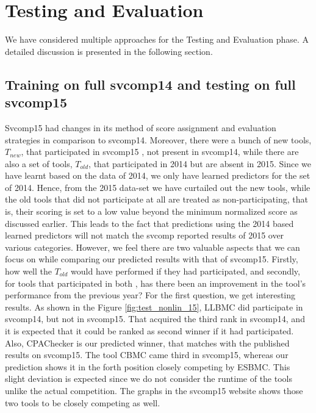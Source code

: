 \section{Testing and Evaluation}
\label{eval}
We have considered multiple approaches for the Testing and Evaluation phase. A detailed discussion is presented in the following section. 
\subsection{Training on full svcomp14 and testing on full svcomp15}
 Svcomp15 had changes in its method of score assignment and evaluation strategies in comparison to svcomp14. Moreover, there were a bunch of new tools, $T_{new}$, that participated in svcomp15 , not present in svcomp14, while there are also a set of tools, $T_{old}$, that participated in 2014 but are absent in 2015. Since we have learnt based on the data of 2014, we only have learned predictors for the set of 2014. Hence, from the 2015 data-set we have curtailed out the new tools, while the old tools that did not participate at all are treated as non-participating, that is, their scoring is set to a low value beyond the minimum normalized score as discussed earlier. This leads to the fact that predictions using the 2014 based learned predictors will not match the svcomp reported results of 2015 over various categories. However, we feel there are two valuable aspects that we can focus on while comparing our predicted results with that of svcomp15. Firstly, how well the $T_{old}$ would have performed if they had participated, and secondly, for tools that participated in both , has there been an improvement in the tool's performance from the previous year? \newline
 For the first question, we get interesting results. 
As shown in the Figure \ref{fig:test_nonlin_15}, LLBMC did participate in svcomp14, but not in svcomp15. That acquired the third rank in svcomp14, and it is expected that it could be ranked as second winner if it had participated. Also, CPAChecker is our predicted winner, that matches with the published results on svcomp15. The tool CBMC came third in svcomp15, whereas our prediction shows it in the forth position closely competing by ESBMC. This slight deviation is expected since we do not consider the runtime of the tools unlike the actual competition. The graphs in the svcomp15 website shows those two tools to be closely competing as well.

